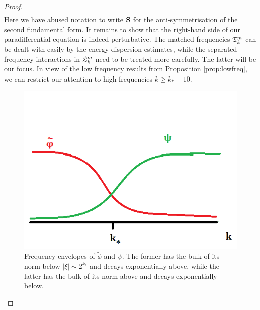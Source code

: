 \begin{proof}
\begin{align*}
		\end{align*}
	Here we have abused notation to write ${\bf S}$ for the anti-symmetrisation of the second fundamental form. It remains to show that the right-hand side of our paradifferential equation is indeed perturbative. The matched frequencies $\mathfrak T_k^m$ can be dealt with easily by the energy dispersion estimates, while the separated frequency interactions in $\mathfrak L_k^m$ need to be treated more carefully. The latter will be our focus. In view of the low frequency results from Proposition \ref{prop:lowfreq}, we can restrict our attention to high frequencies $k \geq k_* - 10$. 
	\begin{figure}[h]
	\begin{center}
		\includegraphics{graphics/envelope2}
		\caption{Frequency envelopes of $\widetilde \phi$ and $\psi$. The former has the bulk of its norm below $|\xi| \sim 2^{k_*}$ and decays exponentially above, while the latter has the bulk of its norm above and decays exponentially below. }
	\end{center}
\end{figure}


\end{proof}
